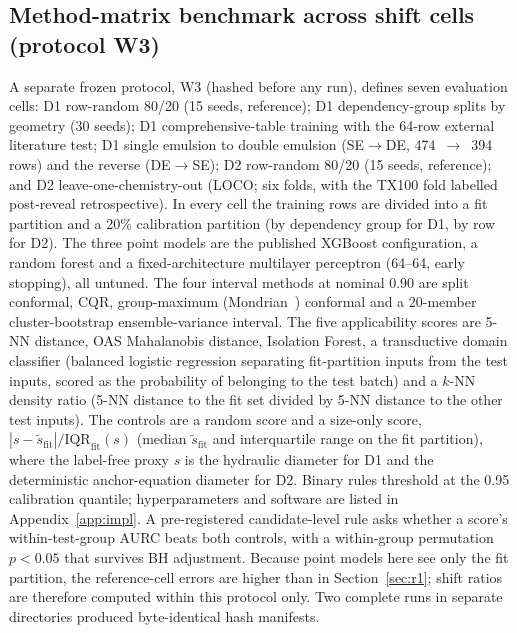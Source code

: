 \documentclass[11pt,a4paper]{article}
\newcommand{\tox}{TX100}
\begin{document}
\subsection{Method-matrix benchmark across shift cells (protocol W3)}
\label{sec:w3protocol}
A separate frozen protocol, W3 (hashed before any run), defines seven
evaluation cells: D1 row-random 80/20 (15 seeds, reference); D1 dependency-group splits
by geometry (30 seeds); D1 comprehensive-table training with the 64-row
external literature test; D1 single emulsion to double emulsion (SE$\to$DE,
474~$\to$~394 rows) and the reverse (DE$\to$SE); D2 row-random 80/20 (15
seeds, reference); and D2 leave-one-chemistry-out (LOCO; six folds, with the
\tox{} fold labelled post-reveal retrospective). In every cell the
training rows are divided into a fit partition and a 20\% calibration
partition (by dependency group for D1, by row for D2). The three point
models are the published XGBoost configuration, a random forest and a
fixed-architecture multilayer perceptron (64--64, early stopping), all
untuned. The four interval methods at nominal 0.90 are split conformal, CQR,
group-maximum (Mondrian~\cite{vovk2005}) conformal and a 20-member cluster-bootstrap
ensemble-variance interval. The five applicability scores are 5-NN distance, OAS Mahalanobis distance, Isolation
Forest, a transductive domain classifier (balanced logistic regression
separating fit-partition inputs from the test inputs, scored as the
probability of belonging to the test batch) and a $k$-NN density ratio (5-NN
distance to the fit set divided by 5-NN distance to the other test inputs).
The controls are a random score and a size-only score,
$|s-\tilde{s}_{\mathrm{fit}}|/\mathrm{IQR}_{\mathrm{fit}}(s)$ (median $\tilde{s}_{\mathrm{fit}}$ and
interquartile range on the fit partition), where the
label-free proxy $s$ is the hydraulic diameter for D1 and the deterministic
anchor-equation diameter for D2. Binary rules threshold at the 0.95
calibration quantile; hyperparameters and software are listed in
Appendix~\ref{app:impl}. A
pre-registered candidate-level rule asks whether a score's within-test-group
AURC beats both controls, with a within-group permutation $p<0.05$ that
survives BH adjustment. Because point models here see only the fit partition, the
reference-cell errors are higher than in Section~\ref{sec:r1}; shift ratios
are therefore computed within this protocol only. Two complete runs in
separate directories produced byte-identical hash manifests.
\end{document}
